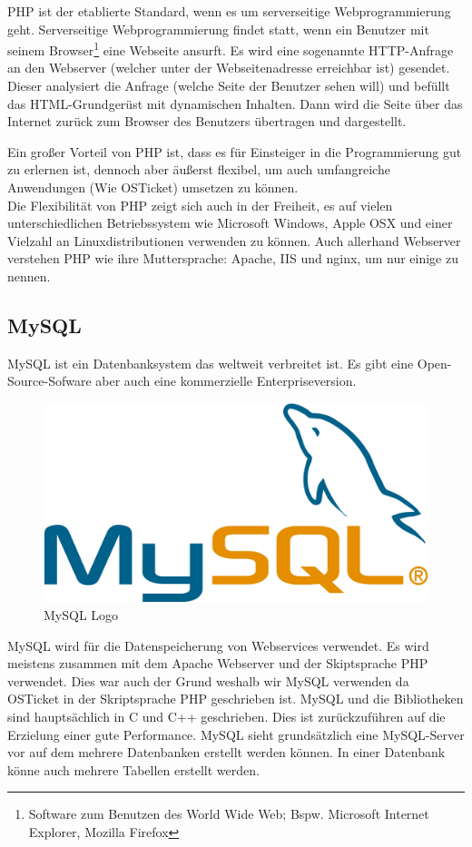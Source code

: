 	PHP ist der etablierte Standard, wenn es um serverseitige Webprogrammierung geht. Serverseitige Webprogrammierung findet statt, wenn ein Benutzer mit seinem Browser\footnote{Software zum Benutzen des World Wide Web; Bspw. Microsoft Internet Explorer, Mozilla Firefox} eine Webseite ansurft. Es wird eine sogenannte HTTP-Anfrage an den Webserver (welcher unter der Webseitenadresse erreichbar ist) gesendet. Dieser analysiert die Anfrage (welche Seite der Benutzer sehen will) und befüllt das HTML-Grundgerüst mit dynamischen Inhalten. Dann wird die Seite über das Internet zurück zum Browser des Benutzers übertragen und dargestellt.
	
	Ein großer Vorteil von PHP ist, dass es für Einsteiger in die Programmierung gut zu erlernen ist, dennoch aber äußerst flexibel, um auch umfangreiche Anwendungen (Wie OSTicket) umsetzen zu können. \\
	Die Flexibilität von PHP zeigt sich auch in der Freiheit, es auf vielen unterschiedlichen Betriebssystem wie Microsoft Windows, Apple OSX und einer Vielzahl an Linuxdistributionen verwenden zu können. Auch allerhand Webserver verstehen PHP wie ihre Muttersprache: Apache, IIS und nginx, um nur einige zu nennen.
	
	\subsection{MySQL}
	MySQL ist ein Datenbanksystem das weltweit verbreitet ist. Es gibt eine Open-Source-Sofware aber auch eine kommerzielle Enterpriseversion.
	
	\begin{figure}[h]
		\centering
		\includegraphics[scale=.35]{figures/mysql_logo.png}
		\caption{MySQL Logo}
		\label{MySQL_Logo}
	\end{figure}
	
	MySQL wird für die Datenspeicherung von Webservices verwendet. Es wird meistens zusammen mit dem Apache Webserver und der Skiptsprache PHP verwendet. Dies war auch der Grund weshalb wir MySQL verwenden da OSTicket in der Skriptsprache PHP geschrieben ist.
	MySQL und die Bibliotheken sind hauptsächlich in C und C++ geschrieben. Dies ist zurückzuführen auf die Erzielung einer gute Performance.
	MySQL sieht grundsätzlich eine MySQL-Server vor auf dem mehrere Datenbanken erstellt werden können. In einer Datenbank könne auch mehrere Tabellen erstellt werden.
	

